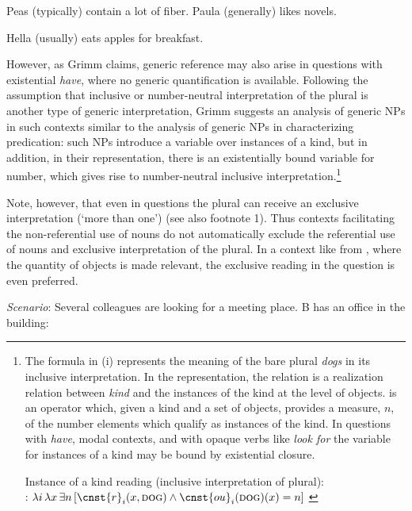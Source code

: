 \documentclass[output=paper,colorlinks,citecolor=brown]{langscibook}
\begin{document}
\ea\label{ex:geist:10}
\ea Peas (typically) contain a lot of fiber.
\label{ex:geist:10a}
\ex Paula (generally) likes novels. 
\label{ex:geist:10b}
\z\z

\ea\label{ex:geist:11}
Hella (usually) eats apples for breakfast.
\z 

\noindent However, as Grimm claims, generic reference may also arise in questions with existential \textit{have}, where no generic quantification is available. Following the assumption that inclusive or number-neutral interpretation of the plural is another type of generic interpretation, Grimm suggests an analysis of generic NPs in such contexts similar to the analysis of generic NPs in characterizing predication: such NPs introduce a variable over instances of a kind, but in addition, in their representation, there is an existentially bound variable for number, which gives rise to number-neutral inclusive interpretation.\footnote{\label{fn:InstanceKind} The formula in (i) represents the meaning of the bare plural \textit{dogs} in its inclusive interpretation. In the representation, the relation  is a realization relation between \textit{kind} and the instances of the kind at the level of objects.  is an operator which, given a kind and a set of objects, provides a measure, $n$, of the number elements which qualify as instances of the kind. In questions with \textit{have}, modal contexts, and with opaque verbs like \textit{look for} the variable for instances of a kind may be bound by existential closure. 

\ea Instance of a kind reading (inclusive interpretation of plural):\\
: $\lambda i \, \lambda x \, \exists n \,[\cnst{r}_i (x, \textsc{dog}) \wedge \cnst{ou}_i (\textsc{dog})(x)=n]$ \hfill \citep[7]{Grimm2013}
\z}

Note, however, that even in questions the plural can receive an exclusive interpretation (`more than one') (see also footnote 1). Thus contexts facilitating the non-referential use of nouns do not automatically exclude the referential use of nouns and exclusive interpretation of the plural. In a context like  from \citet{Grimm2013}, where the quantity of objects is made relevant, the exclusive reading in the question is even preferred.

\eanoraggedright\label{ex:geist:12} \textit{Scenario}: Several colleagues are looking for a meeting place. B has an office in the building:
\begin{xlist}
\label{ex:geist:12A:}
\label{ex:geist:12B:}
\end{xlist}
\z
	
\end{document}
